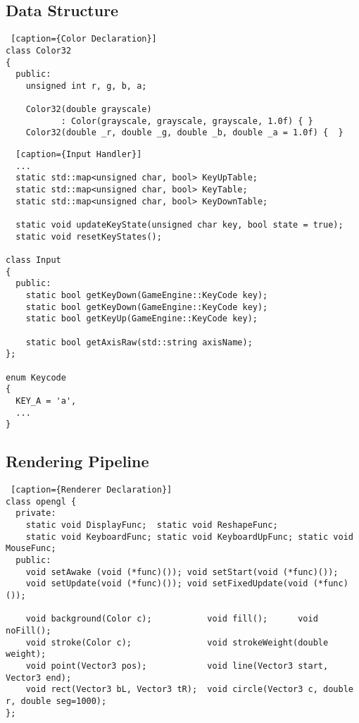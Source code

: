 


\subsection*{Data Structure}







\begin{lstlisting} [caption={Color Declaration}]
class Color32
{
  public:
    unsigned int r, g, b, a;

    Color32(double grayscale) 
           : Color(grayscale, grayscale, grayscale, 1.0f) { }
    Color32(double _r, double _g, double _b, double _a = 1.0f) {  }

\end{lstlisting}


\begin{lstlisting}  [caption={Input Handler}]
  ...
  static std::map<unsigned char, bool> KeyUpTable;
  static std::map<unsigned char, bool> KeyTable;
  static std::map<unsigned char, bool> KeyDownTable;

  static void updateKeyState(unsigned char key, bool state = true);
  static void resetKeyStates();

class Input
{
  public:
    static bool getKeyDown(GameEngine::KeyCode key);
    static bool getKeyDown(GameEngine::KeyCode key);
    static bool getKeyUp(GameEngine::KeyCode key);

    static bool getAxisRaw(std::string axisName);
};

enum Keycode 
{
  KEY_A = 'a',
  ...
}

\end{lstlisting}



\pagebreak


\subsection*{Rendering Pipeline}

\begin{lstlisting} [caption={Renderer Declaration}]
class opengl {
  private:
    static void DisplayFunc;  static void ReshapeFunc;
    static void KeyboardFunc; static void KeyboardUpFunc; static void MouseFunc;
  public:
    void setAwake (void (*func)()); void setStart(void (*func)());
    void setUpdate(void (*func)()); void setFixedUpdate(void (*func)());

    void background(Color c);           void fill();      void noFill(); 
    void stroke(Color c);               void strokeWeight(double weight);
    void point(Vector3 pos);            void line(Vector3 start, Vector3 end);
    void rect(Vector3 bL, Vector3 tR);  void circle(Vector3 c, double r, double seg=1000); 
};
\end{lstlisting}

